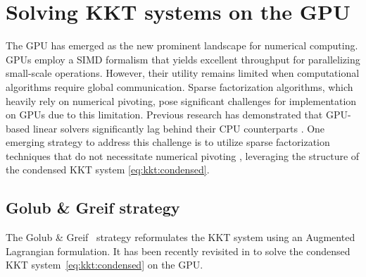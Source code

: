 \section{Solving KKT systems on the GPU}
The GPU has emerged as the new prominent landscape for numerical computing.
GPUs employ a SIMD formalism that yields excellent throughput for parallelizing small-scale operations.
However, their utility remains limited when computational algorithms require global communication.
Sparse factorization algorithms, which heavily rely on numerical pivoting, pose significant challenges for implementation on GPUs due to this limitation. Previous research has demonstrated that GPU-based linear solvers significantly lag behind their CPU counterparts \cite{tasseff2019exploring,swirydowicz2021linear}.
One emerging strategy to address this challenge is to utilize sparse factorization techniques that do not necessitate numerical pivoting \cite{regev2023hykkt,shin2023accelerating}, leveraging the structure of the condensed KKT system \eqref{eq:kkt:condensed}.

\subsection{Golub \& Greif strategy}
\label{sec:kkt:golubgreif}
The Golub \& Greif~\cite{golub2003solving} strategy reformulates the KKT system
using an Augmented Lagrangian formulation.
It has been recently revisited in \cite{regev2023hykkt}
to solve the condensed KKT system~\eqref{eq:kkt:condensed} on the GPU.

